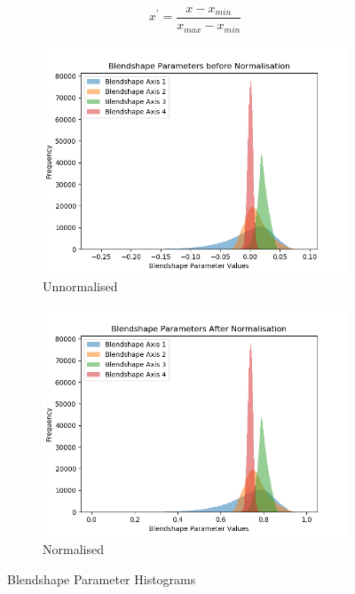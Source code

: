 \begin{equation}\label{eq:normalise}
   x^\prime = \frac{x - x_{min}}{x_{max} - x_{min}} 
\end{equation}

\begin{figure}[h!]
    \centering
    \begin{subfigure}[b]{0.49\textwidth}
        \includegraphics[width=\textwidth]{figures/dataset/shape_params_unnormalised_hist.png}
        \caption{Unnormalised}\label{fig:hist_unnorm}
    \end{subfigure}
    \begin{subfigure}[b]{0.49\textwidth}
        \includegraphics[width=\textwidth]{figures/dataset/shape_params_normalised_hist.png}
        \caption{Normalised}\label{fig:hist_norm}
    \end{subfigure}
    \caption{Blendshape Parameter Histograms}
\end{figure}

